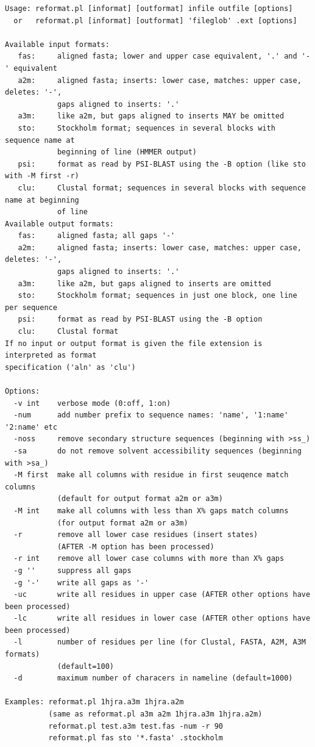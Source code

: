 \documentclass[11pt,a4paper]{article}
\begin{document}
\small 
\begin{verbatim}
Usage: reformat.pl [informat] [outformat] infile outfile [options] 
  or   reformat.pl [informat] [outformat] 'fileglob' .ext [options] 

Available input formats:
   fas:     aligned fasta; lower and upper case equivalent, '.' and '-' equivalent
   a2m:     aligned fasta; inserts: lower case, matches: upper case, deletes: '-',
            gaps aligned to inserts: '.'
   a3m:     like a2m, but gaps aligned to inserts MAY be omitted
   sto:     Stockholm format; sequences in several blocks with sequence name at 
            beginning of line (HMMER output)
   psi:     format as read by PSI-BLAST using the -B option (like sto with -M first -r)
   clu:     Clustal format; sequences in several blocks with sequence name at beginning 
            of line
Available output formats:
   fas:     aligned fasta; all gaps '-'
   a2m:     aligned fasta; inserts: lower case, matches: upper case, deletes: '-', 
            gaps aligned to inserts: '.'
   a3m:     like a2m, but gaps aligned to inserts are omitted
   sto:     Stockholm format; sequences in just one block, one line per sequence
   psi:     format as read by PSI-BLAST using the -B option 
   clu:     Clustal format
If no input or output format is given the file extension is interpreted as format 
specification ('aln' as 'clu')

Options:
  -v int    verbose mode (0:off, 1:on)
  -num      add number prefix to sequence names: 'name', '1:name' '2:name' etc
  -noss     remove secondary structure sequences (beginning with >ss_)
  -sa       do not remove solvent accessibility sequences (beginning with >sa_)
  -M first  make all columns with residue in first seuqence match columns 
            (default for output format a2m or a3m)
  -M int    make all columns with less than X% gaps match columns 
            (for output format a2m or a3m)
  -r        remove all lower case residues (insert states) 
            (AFTER -M option has been processed)
  -r int    remove all lower case columns with more than X% gaps
  -g ''     suppress all gaps
  -g '-'    write all gaps as '-'
  -uc       write all residues in upper case (AFTER other options have been processed)
  -lc       write all residues in lower case (AFTER other options have been processed)
  -l        number of residues per line (for Clustal, FASTA, A2M, A3M formats) 
            (default=100)
  -d        maximum number of characers in nameline (default=1000)

Examples: reformat.pl 1hjra.a3m 1hjra.a2m  
          (same as reformat.pl a3m a2m 1hjra.a3m 1hjra.a2m)
          reformat.pl test.a3m test.fas -num -r 90
          reformat.pl fas sto '*.fasta' .stockholm
\end{verbatim} 
\normalsize
\end{document}
